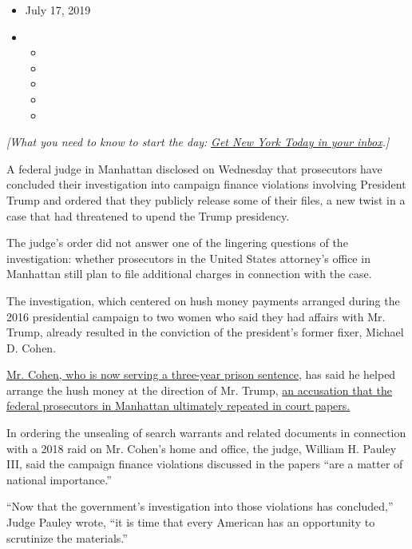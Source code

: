 \begin{itemize}
\item
  July 17, 2019
\item
  \begin{itemize}
  \item
  \item
  \item
  \item
  \item
  \end{itemize}
\end{itemize}

\emph{{[}What you need to know to start the day:}
\href{https://www.nytimes3xbfgragh.onion/newsletters/newyorktoday?module=inline}{\emph{Get
New York Today in your inbox}}\emph{.{]}}

A federal judge in Manhattan disclosed on Wednesday that prosecutors
have concluded their investigation into campaign finance violations
involving President Trump and ordered that they publicly release some of
their files, a new twist in a case that had threatened to upend the
Trump presidency.

The judge's order did not answer one of the lingering questions of the
investigation: whether prosecutors in the United States attorney's
office in Manhattan still plan to file additional charges in connection
with the case.

The investigation, which centered on hush money payments arranged during
the 2016 presidential campaign to two women who said they had affairs
with Mr. Trump, already resulted in the conviction of the president's
former fixer, Michael D. Cohen.

\href{https://www.nytimes3xbfgragh.onion/2018/12/12/nyregion/michael-cohen-sentence-trump.html}{Mr.
Cohen, who is now serving a three-year prison sentence}, has said he
helped arrange the hush money at the direction of Mr. Trump,
\href{https://www.nytimes3xbfgragh.onion/2018/12/07/nyregion/michael-cohen-sentence.html}{an
accusation that the federal prosecutors in Manhattan ultimately repeated
in court papers.}

In ordering the unsealing of search warrants and related documents in
connection with a 2018 raid on Mr. Cohen's home and office, the judge,
William H. Pauley III, said the campaign finance violations discussed in
the papers ``are a matter of national importance.''

``Now that the government's investigation into those violations has
concluded,'' Judge Pauley wrote, ``it is time that every American has an
opportunity to scrutinize the materials.''

